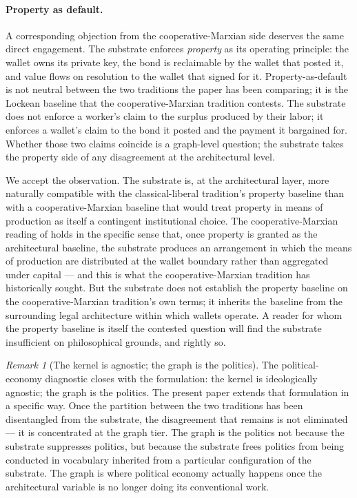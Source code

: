 \documentclass[11pt,a4paper]{article}
\theoremstyle{remark}
\newtheorem{remark}{Remark}[section]
\begin{document}
\paragraph{Property as default.}
A corresponding objection from the cooperative-Marxian side
deserves the same direct engagement. The substrate enforces
\emph{property} as its operating principle: the wallet owns its
private key, the bond is reclaimable by the wallet that posted
it, and value flows on resolution to the wallet that signed for
it. Property-as-default is not neutral between the two
traditions the paper has been comparing; it is the Lockean
baseline that the cooperative-Marxian tradition contests. The
substrate does not enforce a worker's claim to the surplus
produced by their labor; it enforces a wallet's claim to the
bond it posted and the payment it bargained for. Whether those
two claims coincide is a graph-level question; the substrate
takes the property side of any disagreement at the architectural
level.

We accept the observation. The substrate is, at the
architectural layer, more naturally compatible with the
classical-liberal tradition's property baseline than with a
cooperative-Marxian baseline that would treat property in means
of production as itself a contingent institutional choice. The
cooperative-Marxian reading of 
holds in the specific sense that, once property is granted as
the architectural baseline, the substrate produces an
arrangement in which the means of production are distributed at
the wallet boundary rather than aggregated under capital --- and
this is what the cooperative-Marxian tradition has historically
sought. But the substrate does not establish the property
baseline on the cooperative-Marxian tradition's own terms; it
inherits the baseline from the surrounding legal architecture
within which wallets operate. A reader for whom the property
baseline is itself the contested question will find the
substrate insufficient on philosophical grounds, and rightly so.

\begin{remark}[The kernel is agnostic; the graph is the politics]
The political-economy diagnostic closes with the formulation:
the kernel is ideologically agnostic; the graph is the politics.
The present paper extends that formulation in a specific way. Once the partition between the two traditions has
been disentangled from the substrate, the disagreement that
remains is not eliminated --- it is concentrated at the graph
tier. The graph is the politics not because the substrate
suppresses politics, but because the substrate frees politics
from being conducted in vocabulary inherited from a particular
configuration of the substrate. The graph is where political
economy actually happens once the architectural variable is no
longer doing its conventional work.
\end{remark}
\end{document}
